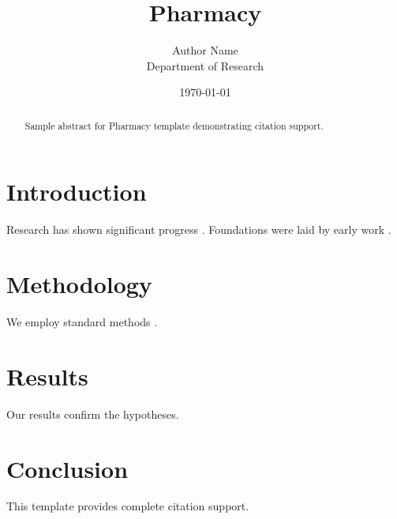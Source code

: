 \documentclass{mdpi}
\title{Pharmacy}
\author{Author Name \\ \small Department of Research}
\date{\today}
\begin{document}
\maketitle

\begin{abstract}
Sample abstract for Pharmacy template demonstrating citation support.
\end{abstract}

\section{Introduction}
Research has shown significant progress \citep{einstein1905}. Foundations were laid by early work \citep{turing1950}.

\section{Methodology}
We employ standard methods \citep{knuth1984}.

\section{Results}
Our results confirm the hypotheses.

\section{Conclusion}
This template provides complete citation support.



\end{document}
